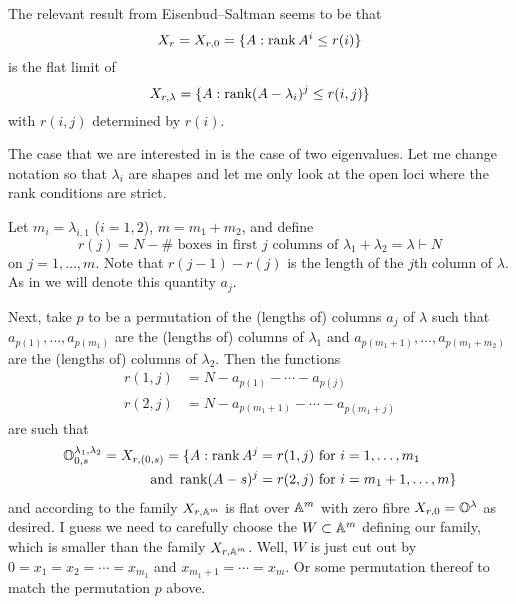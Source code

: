 \documentclass[draft]{article}
\begin{document}
\begin{itemize}
\begin{remark}

The relevant result from Eisenbud--Saltman seems to be that 
$$X_r = X_{r,0} = \{A:\rk A^i \le r(i) \}$$ 
is the flat limit of 
$$X_{r,\lambda} = \{A : \rk (A-\lambda_i)^j\le r(i,j)\}$$
with $r(i,j)$ determined by $r(i)$.  

The case that we are interested in is the case of two eigenvalues. Let me change notation so that $\lambda_i$ are shapes and let me only look at the open loci where the rank conditions are strict. 

Let $m_i = \lambda_{i,1}$ ($i = 1,2$), $m = m_1 + m_2$, and define
$$r(j) = N - \#\text{~boxes in first $j$ columns of }\lambda_1 + \lambda_2 = \lambda\vdash N$$
on $j = 1,\dots,m$. Note that $r(j-1) - r(j)$ is the length of the $j$th column of $\lambda$. As in \cite{eisenbud1989rank} we will denote this quantity $a_j$. 
% 

Next, take $p$ to be a permutation of the (lengths of) columns $a_j$ of $\lambda$ such that $a_{p(1)},\dots,a_{p(m_1)}$ are the (lengths of) columns of $\lambda_1$ and $a_{p(m_1 + 1)},\dots, a_{p(m_1 + m_2)}$ are the (lengths of) columns of $\lambda_2$. 
Then the functions 
$$
\begin{aligned}
r(1,j) &= N - a_{p(1)} - \cdots - a_{p(j)} \\
r(2,j) &= N - a_{p(m_1 + 1)} - \cdots - a_{p(m_1 + j)}
\end{aligned}
$$
are such that 
\begin{align*}
    \OO^{\lambda_1,\lambda_2}_{0,s} = X_{r,(0,s)} = \{A:\rk A^j &= r(1,j) \text{ for } i = 1,\dots, m_1 \\ \text{ and } \rk (A-s)^j &= r(2,j) \text{ for } i = m_1 + 1 ,\dots, m \}
\end{align*}
and according to \cite[Theorem 2.1(iii)]{eisenbud1989rank} the family $X_{r,\AA^m}$ is flat over $\AA^m$ with zero fibre $X_{r,0} = \OO^\lambda$ as desired. I guess we need to carefully choose the $W \subset \AA^m$ defining our family, which is smaller than the family $X_{r,\AA^m}$. Well, $W$ is just cut out by $0 = x_1 = x_2 = \cdots = x_{m_1}$ and $ x_{m_1 + 1} = \cdots = x_m$. Or some permutation thereof to match the permutation $p$ above.
 


\end{remark}
\end{itemize}
\end{document}
